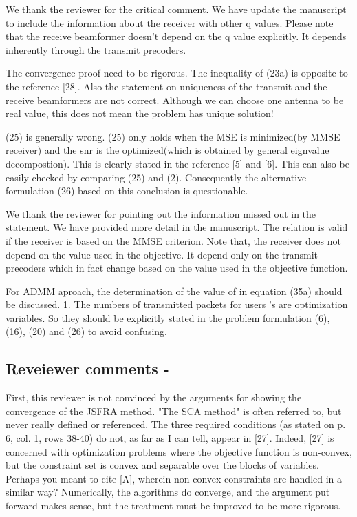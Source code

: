 \resp We thank the reviewer for the critical comment. We have update the manuscript to include the information about the receiver with other q values. Please note that the receive beamformer doesn't depend on the q value explicitly. It depends inherently through the transmit precoders.

 The convergence proof need to be rigorous. The inequality of (23a) is opposite to the reference [28]. Also the statement on uniqueness of the transmit and the receive beamformers are not correct. Although we can choose one antenna to be real value, this does not mean the problem has unique solution!

 (25) is generally wrong. (25) only holds when the MSE is minimized(by MMSE receiver) and the snr is the optimized(which is obtained by general eignvalue decompostion). This is clearly stated in the reference [5] and [6]. This can also be easily checked by comparing (25) and (2). Consequently the alternative formulation (26) based on this conclusion is questionable.

\resp We thank the reviewer for pointing out the information missed out in the statement. We have provided more detail in the manuscript. The relation is valid if the receiver is based on the MMSE criterion. Note that, the receiver does not depend on the  value used in the objective. It depend only on the transmit precoders which in fact change based on the  value used in the objective function. 

 For ADMM aproach, the determination of the value of \me{\rho} in equation (35a) should be discussed. 1. The numbers of transmitted packets for users  's are optimization variables. So they should be explicitly stated in the problem formulation (6), (16), (20) and (26) to avoid confusing.

\subsection*{Reveiewer comments - }

 First, this reviewer is not convinced by the arguments for showing the convergence of the JSFRA method. "The SCA method" is often referred to, but never really defined or referenced. The three required conditions (as stated on p. 6, col. 1, rows 38-40) do not, as far as I can tell, appear in [27]. Indeed, [27] is concerned with optimization problems where the objective function is non-convex, but the constraint set is convex and separable over the blocks of variables. Perhaps you meant to cite [A], wherein non-convex constraints are handled in a similar way? Numerically, the algorithms do converge, and the argument put forward makes sense, but the treatment must be improved to be more rigorous.

